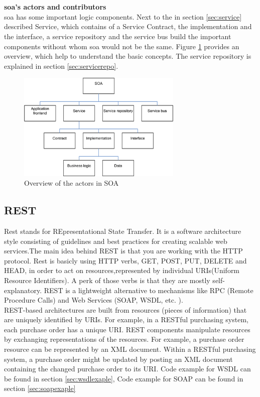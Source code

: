 \documentclass[12pt]{article}
\begin{document}
\\ \\
\textbf{\gls{soa}'s actors and contributors}\\
\gls{soa} has some important logic components. Next to the in section \ref{sec:service} described Service, which contains of a Service Contract, the implementation and the interface, a service repository and the service bus build the important components without whom \gls{soa} would not be the same. Figure \ref{fig:actorsSoa} provides an overview, which help to understand the basic concepts. The service repository is explained in section \ref{sec:servicerepo}.
	\begin{figure}[here!]
	\centering
	\includegraphics[width=0.7\textwidth]{images/arg2}
	\caption{Overview of the actors in SOA \cite{arg2}}
	\label{fig:actorsSoa}
	\end{figure}
	\FloatBarrier
\subsection{REST}
Rest stands for REpresentational State Transfer. It is a software architecture style consisting of guidelines and best practices 
for creating scalable web services.The main idea behind REST is that you are working with the HTTP protocol. Rest is basicly using HTTP verbs, GET, POST, PUT, DELETE and HEAD, in order to act on resources,represented by individual URIs(Uniform Resource Identifiers). 
A perk of those verbs is that they are mostly self-explanatory. REST is a lightweight alternative to mechanisms like RPC (Remote Procedure Calls) and Web Services (SOAP, WSDL, etc. ). \\
REST-based architectures are built from resources (pieces of information) that are uniquely identified by URIs. For example, in a RESTful purchasing system, each purchase order has a unique URI.
REST components manipulate resources by exchanging representations of the resources. For example, a purchase order resource can be represented by an XML document. Within a RESTful purchasing system, a purchase order might be updated by posting an XML document containing the changed purchase order to its URI.
Code example for WSDL can be found in section \ref{sec:wsdlexaple}, 
Code example for SOAP can be found in section \ref{sec:soapexaple}
\end{document}
